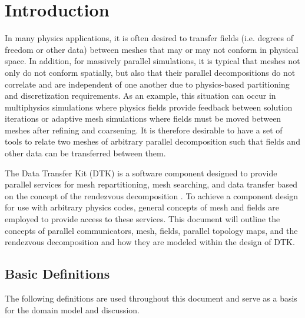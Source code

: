 \documentclass[letterpaper,12pt]{article}
\begin{document}
\section{Introduction}\label{sec:intro}
In many physics applications, it is often desired to transfer fields
(i.e. degrees of freedom or other data) between meshes that may or may
not conform in physical space. In addition, for massively parallel
simulations, it is typical that meshes not only do not conform
spatially, but also that their parallel decompositions do not
correlate and are independent of one another due to physics-based
partitioning and discretization requirements. As an example, this
situation can occur in multiphysics simulations where physics fields
provide feedback between solution iterations or adaptive mesh
simulations where fields must be moved between meshes after refining
and coarsening. It is therefore desirable to have a set of tools to
relate two meshes of arbitrary parallel decomposition such that fields
and other data can be transferred between them.

The Data Transfer Kit (DTK) is a software component designed to
provide parallel services for mesh repartitioning, mesh searching, and
data transfer based on the concept of the rendezvous decomposition
\cite{Plimpton_2004}. To achieve a component design for use with
arbitrary physics codes, general concepts of mesh and fields are
employed to provide access to these services. This document will
outline the concepts of parallel communicators, mesh, fields, parallel
topology maps, and the rendezvous decomposition and how they are
modeled within the design of DTK.

\subsection{Basic Definitions}\label{subsec:basic_defs}

The following definitions are used throughout this document and serve
as a basis for the domain model and discussion.
\end{document}

